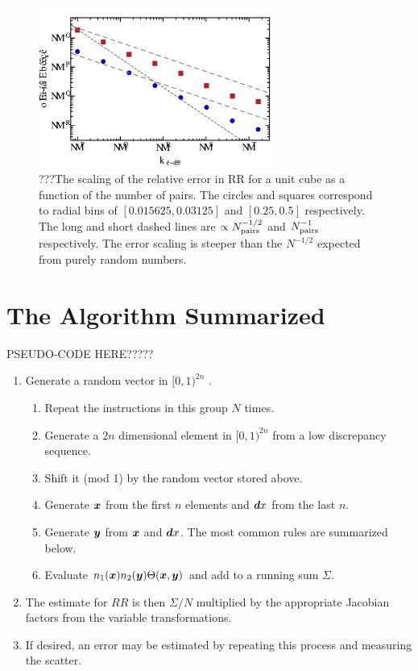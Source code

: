 \documentclass[usenatbib]{mn2e}
\begin{document}
\begin{figure}
\includegraphics[width=3in]{plots/unit3d}
\caption{???The scaling of the relative error in RR for a unit cube as a
function of the number of pairs. The circles and squares correspond to radial
bins of $[0.015625,0.03125]$ and $[0.25,0.5]$ respectively.
The long and short dashed lines are $\propto N_{\rm pairs}^{-1/2}$ and $N_{\rm pairs}^{-1}$ respectively. The error
scaling is steeper than the $N^{-1/2}$ expected from purely random numbers.}
\label{fig:unit3d}
\end{figure}


\section{The Algorithm Summarized}
\label{sec:alg}

PSEUDO-CODE HERE?????
\begin{enumerate}
  \item Generate a random vector in $[0,1)^{2n}$ .
  \begin{enumerate}
    \item Repeat the instructions in this group $N$ times.
    \item Generate a $2n$ dimensional element in $[0,1)^{2n}$ from a low
    discrepancy sequence.
    \item Shift it (mod 1) by the random vector stored above.
    \item Generate ${\bm x}$ from the first $n$ elements and ${\bm dx}$ from the last
    $n$.
    \item Generate ${\bm y}$ from ${\bm x}$ and ${\bm dx}$. The most common rules are
    summarized below.
    \item Evaluate $n_1({\bm x}) n_2({\bm y}) \Theta({\bm x}, {\bm y})$ and add to a running sum
    $\Sigma$.
  \end{enumerate}
  \item The estimate for $RR$ is then $\Sigma/N$ multiplied by the appropriate
  Jacobian factors from the variable transformations. 
  \item If desired, an error may be estimated by repeating this process and
  measuring the scatter. 
\end{enumerate}
\end{document}
